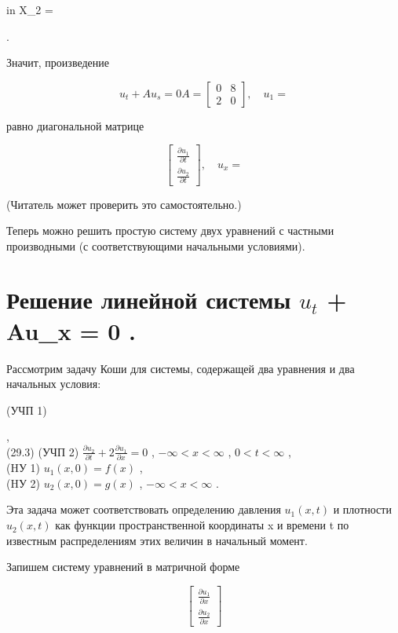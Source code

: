 \documentclass[
  ukrainian,
]{article}
\begin{document}
in X\_2 =

.

Значит, произведение

\[
u_t + Au_s = 0
A =
\begin{bmatrix} 0 & 8 \\ 2 & 0 \end{bmatrix}
, \quad u_1 =
\]

равно диагональной матрице

\[
\begin{bmatrix} \frac{\partial u_1}{\partial t} \\ \frac{\partial u_2}{\partial t} \end{bmatrix}
, \quad u_x =
\]

(Читатель может проверить это самостоятельно.)

Теперь можно решить простую систему двух уравнений с частными
производными (с соответствующими начальными условиями).

\section{\texorpdfstring{Решение линейной системы \(u_t\) + Au\_x = 0
.}{Решение линейной системы u\_t + Au\_x = 0 .}}\label{ux440ux435ux448ux435ux43dux438ux435-ux43bux438ux43dux435ux439ux43dux43eux439-ux441ux438ux441ux442ux435ux43cux44b-u_t-au_x-0-.}

Рассмотрим задачу Коши для системы, содержащей два уравнения и два
начальных условия:

(УЧП 1)

,\\
(29.3) (УЧП 2)
\(\frac{\partial u_2}{\partial t} + 2 \frac{\partial u_1}{\partial x} = 0\)
, \(-\infty < x < \infty\) , \(0 < t < \infty\) ,\\
(HУ 1) \(u_1(x, 0) = f(x)\) ,\\
(HУ 2) \(u_2(x, 0) = g(x)\) , \(-\infty < x < \infty\) .

Эта задача может соответствовать определению давления \(u_1(x, t)\) и
плотности \(u_2(x, t)\) как функции пространственной координаты x и
времени t по известным распределениям этих величин в начальный момент.

Запишем систему уравнений в матричной форме

\[
\begin{bmatrix} \frac{\partial u_1}{\partial x} \\ \frac{\partial u_2}{\partial x} \end{bmatrix}
\]
\end{document}
